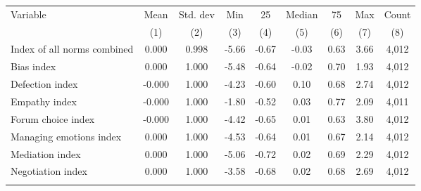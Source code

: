 \begin{tabular}{lcccccccc}
\hline \noalign{\smallskip}Variable & Mean & Std. dev & Min & 25 & Median & 75 & Max & Count\\
 & (1) & (2) & (3) & (4) & (5) & (6) & (7) & (8)\\
\noalign{\smallskip}\hline \noalign{\smallskip}Index of all norms combined & 0.000 & 0.998 & -5.66 & -0.67 & -0.03 & 0.63 & 3.66 & 4,012\\
\quad Bias index & 0.000 & 1.000 & -5.48 & -0.64 & -0.02 & 0.70 & 1.93 & 4,012\\
\quad Defection index & -0.000 & 1.000 & -4.23 & -0.60 & 0.10 & 0.68 & 2.74 & 4,012\\
\quad Empathy index & -0.000 & 1.000 & -1.80 & -0.52 & 0.03 & 0.77 & 2.09 & 4,011\\
\quad Forum choice index & -0.000 & 1.000 & -4.42 & -0.65 & 0.01 & 0.63 & 3.80 & 4,012\\
\quad Managing emotions index & 0.000 & 1.000 & -4.53 & -0.64 & 0.01 & 0.67 & 2.14 & 4,012\\
\quad Mediation index & 0.000 & 1.000 & -5.06 & -0.72 & 0.02 & 0.69 & 2.29 & 4,012\\
\quad Negotiation index & 0.000 & 1.000 & -3.58 & -0.68 & 0.02 & 0.68 & 2.69 & 4,012\\
\noalign{\smallskip}\hline\end{tabular}
